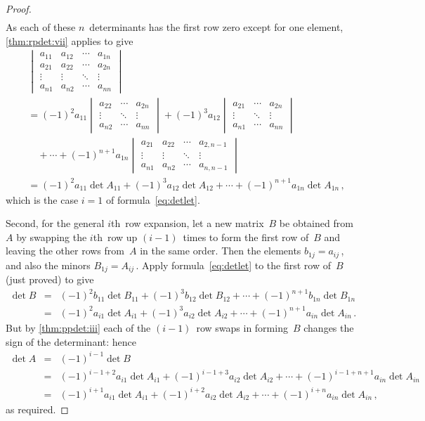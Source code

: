 \begin{proof}
\begin{align*}
\end{align*}
As each of these \(n\)~determinants has the first row zero except for one element,  \cref{thm:rpdet:vii} applies to give
\begin{align*}&
\begin{vmatrix} a_{11}&a_{12}&\cdots&a_{1n}
\\ a_{21}&a_{22}&\cdots&a_{2n}
\\ \vdots&\vdots&\ddots&\vdots
\\ a_{n1}&a_{n2}&\cdots&a_{nn}
\end{vmatrix}
\\&=
(-1)^2a_{11}\begin{vmatrix} 
 a_{22}&\cdots&a_{2n}
\\ \vdots&\ddots&\vdots
\\ a_{n2}&\cdots&a_{nn}
\end{vmatrix}
+(-1)^3a_{12}\begin{vmatrix} 
 a_{21}&\cdots&a_{2n}
\\ \vdots&\ddots&\vdots
\\ a_{n1}&\cdots&a_{nn}
\end{vmatrix}
\\&\quad{}
+\cdots
+(-1)^{n+1}a_{1n}\begin{vmatrix}  
a_{21}&a_{22}&\cdots&a_{2,n-1}
\\ \vdots&\vdots&\ddots&\vdots
\\ a_{n1}&a_{n2}&\cdots&a_{n,n-1}
\end{vmatrix}
\\&=(-1)^2a_{11}\det A_{11}
+(-1)^3a_{12}\det A_{12}
+\cdots
+(-1)^{n+1}a_{1n}\det A_{1n}\,,
\end{align*}
which is the case \(i=1\) of formula~\eqref{eq:detlet}.

Second, for the general \(i\)th~row expansion, let a new matrix~\(B\) be obtained from~\(A\) by swapping the \(i\)th~row up \((i-1)\)~times to form the first row of~\(B\) and leaving the other rows from~\(A\) in the same order.
Then the elements \(b_{1j}=a_{ij}\)\,, and also the minors \(B_{1j}=A_{ij}\)\,.
Apply formula~\eqref{eq:detlet} to the first row of~\(B\) (just proved) to give
\begin{eqnarray*}
\det B&=&(-1)^2b_{11}\det B_{11}
+(-1)^3b_{12}\det B_{12}
+\cdots
+(-1)^{n+1}b_{1n}\det B_{1n}
\\&=&(-1)^2a_{i1}\det A_{i1}
+(-1)^3a_{i2}\det A_{i2}
+\cdots
+(-1)^{n+1}a_{in}\det A_{in}\,.
\end{eqnarray*}
But by \cref{thm:ppdet:iii} each of the \((i-1)\)~row swaps in forming~\(B\) changes the sign of the determinant: hence
\begin{eqnarray*}
\det A&=&(-1)^{i-1}\det B
\\&=&(-1)^{i-1+2}a_{i1}\det A_{i1}
+(-1)^{i-1+3}a_{i2}\det A_{i2}
+\cdots
+(-1)^{i-1+n+1}a_{in}\det A_{in}
\\&=&(-1)^{i+1}a_{i1}\det A_{i1}
+(-1)^{i+2}a_{i2}\det A_{i2}
+\cdots
+(-1)^{i+n}a_{in}\det A_{in}\,,
\end{eqnarray*}
as required.
\end{proof}



